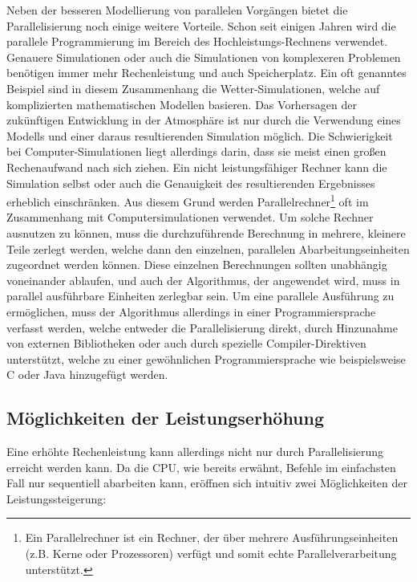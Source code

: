 		Neben der besseren Modellierung von parallelen Vorgängen bietet die Parallelisierung noch einige weitere Vorteile. Schon seit einigen Jahren wird die parallele Programmierung im Bereich des Hochleistungs-Rechnens verwendet. Genauere Simulationen oder auch die Simulationen von komplexeren Problemen benötigen immer mehr Rechenleistung und auch Speicherplatz. Ein oft genanntes Beispiel sind in diesem Zusammenhang die Wetter-Simulationen, welche auf komplizierten mathematischen Modellen basieren. Das Vorhersagen der zukünftigen Entwicklung in der Atmosphäre ist nur durch die Verwendung eines Modells und einer daraus resultierenden Simulation möglich.
		Die Schwierigkeit bei Computer-Simulationen liegt allerdings darin, dass sie meist einen großen Rechenaufwand nach sich ziehen. Ein nicht leistungsfähiger Rechner kann die Simulation selbst oder auch die Genauigkeit des resultierenden Ergebnisses erheblich einschränken. Aus diesem Grund werden Parallelrechner\footnote{Ein Parallelrechner ist ein Rechner, der über mehrere Ausführungseinheiten (z.B. Kerne oder Prozessoren) verfügt und somit echte Parallelverarbeitung unterstützt.} oft im Zusammenhang mit Computersimulationen verwendet. Um solche Rechner ausnutzen zu können, muss die durchzuführende Berechnung in mehrere, kleinere Teile zerlegt werden, welche dann den einzelnen, parallelen Abarbeitungseinheiten zugeordnet werden können. Diese einzelnen Berechnungen sollten unabhängig voneinander ablaufen, und auch der Algorithmus, der angewendet wird, muss in parallel ausführbare Einheiten zerlegbar sein. Um eine parallele Ausführung zu ermöglichen, muss der Algorithmus allerdings in einer Programmiersprache verfasst werden, welche entweder die Parallelisierung direkt, durch Hinzunahme von externen Bibliotheken oder auch durch spezielle Compiler-Direktiven unterstützt, welche zu einer gewöhnlichen Programmiersprache wie beispielsweise C oder Java hinzugefügt werden. \cite{ParaProgRauber}\\
		
		\subsection{Möglichkeiten der Leistungserhöhung}
			\label{MoeglichkeitenLeistungserhoehung}
		
			Eine erhöhte Rechenleistung kann allerdings nicht nur durch Parallelisierung erreicht werden kann. Da die CPU, wie bereits erwähnt, Befehle im einfachsten Fall nur sequentiell abarbeiten kann, eröffnen sich intuitiv zwei Möglichkeiten der Leistungssteigerung:
		
